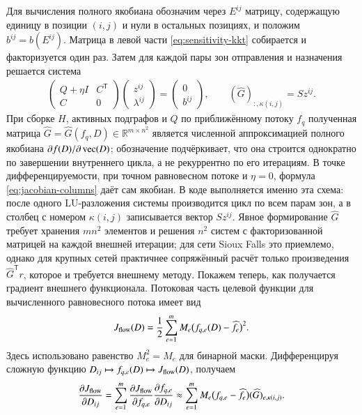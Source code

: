 \documentclass{crm-article}
\begin{document}
Для вычисления полного якобиана обозначим через $E^{ij}$ матрицу, содержащую
единицу в позиции $(i,j)$ и нули в остальных позициях, и положим
$b^{ij}=b(E^{ij})$. Матрица в левой части \eqref{eq:sensitivity-kkt}
собирается и факторизуется один раз. Затем для каждой пары зон отправления и
назначения решается система
\begin{gather}
 \begin{pmatrix}
  Q+\eta I & C^{\mathsf T}\\
  C & 0
 \end{pmatrix}
 \begin{pmatrix}z^{ij}\\ \lambda^{ij}\end{pmatrix}
 =
 \begin{pmatrix}0\\ b^{ij}\end{pmatrix},
 \qquad
 (\widehat G)_{:,\kappa(i,j)}=Sz^{ij}.
 \label{eq:jacobian-columns}
\end{gather}
При сборке $H$, активных подграфов и $Q$ по приближённому потоку $f_q$
полученная матрица $\widehat G=\widehat G(f_q,D)\in\mathbb R^{m\times n^2}$
является численной аппроксимацией полного якобиана
$\partial f(D)/\partial\mathop{\rm vec}(D)$; обозначение подчёркивает, что
она строится однократно по завершении внутреннего цикла, а не рекуррентно
по его итерациям. В точке дифференцируемости,
при точном равновесном потоке и $\eta=0$, формула
\eqref{eq:jacobian-columns} даёт сам якобиан. В коде выполняется именно эта
схема: после одного LU-разложения системы производится цикл по всем парам зон,
а в столбец с номером $\kappa(i,j)$ записывается вектор $Sz^{ij}$.
Явное формирование $\widehat G$ требует хранения $mn^2$ элементов и решения
$n^2$ систем с факторизованной матрицей на каждой внешней итерации; для
сети Sioux Falls это приемлемо, однако для крупных сетей практичнее
сопряжённый расчёт только произведения $\widehat G^{\mathsf T}r$, которое и
требуется внешнему методу.
Покажем теперь, как получается градиент внешнего функционала. Потоковая часть целевой
функции для вычисленного равновесного потока имеет вид
\begin{gather}
 J_{\rm flow}(D)=\frac12\sum\limits_{e=1}^{m}
 M_e\bigl(f_{q,e}(D)-\widehat f_e\bigr)^2.
 \label{eq:flow-objective-finite}
\end{gather}
Здесь использовано равенство $M_e^2=M_e$ для бинарной маски. Дифференцируя
сложную функцию $D_{ij}\mapsto f_{q,e}(D)\mapsto J_{\rm flow}(D)$, получаем
\begin{gather}
 \frac{\partial J_{\rm flow}}{\partial D_{ij}}
 =\sum\limits_{e=1}^{m}
 \frac{\partial J_{\rm flow}}{\partial f_{q,e}}
 \frac{\partial f_{q,e}}{\partial D_{ij}}
 \approx\sum\limits_{e=1}^{m}
 M_e\bigl(f_{q,e}-\widehat f_e\bigr)
 (\widehat G)_{e,\kappa(i,j)}.
 \label{eq:gradient-component}
\end{gather}
\end{document}
